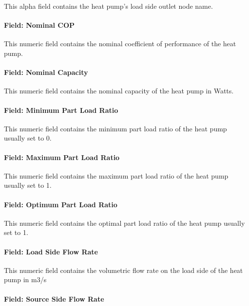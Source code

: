 This alpha field contains the heat pump's load side outlet node name.

\paragraph{Field: Nominal COP}\label{field-nominal-cop-4}

This numeric field contains the nominal coefficient of performance of the heat pump.

\paragraph{Field: Nominal Capacity}\label{field-nominal-capacity-8}

This numeric field contains the nominal capacity of the heat pump in Watts.

\paragraph{Field: Minimum Part Load Ratio}\label{field-minimum-part-load-ratio-11}

This numeric field contains the minimum part load ratio of the heat pump usually set to 0.

\paragraph{Field: Maximum Part Load Ratio}\label{field-maximum-part-load-ratio-11}

This numeric field contains the maximum part load ratio of the heat pump usually set to 1.

\paragraph{Field: Optimum Part Load Ratio}\label{field-optimum-part-load-ratio-11}

This numeric field contains the optimal part load ratio of the heat pump usually set to 1.

\paragraph{Field: Load Side Flow Rate}\label{field-load-side-flow-rate}

This numeric field contains the volumetric flow rate on the load side of the heat pump in m3/s

\paragraph{Field: Source Side Flow Rate}\label{field-source-side-flow-rate}

